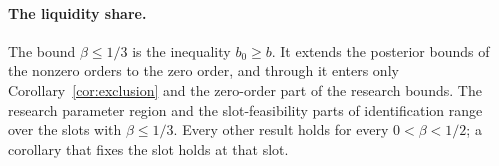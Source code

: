 \paragraph{The liquidity share.}\label{par:beta-scope}
The bound \(\beta\le1/3\) is the inequality \(b_0\ge b\). It extends the posterior bounds of the nonzero orders
to the zero order, and through it enters only Corollary~\ref{cor:exclusion} and the zero-order part of the
research bounds. The research parameter region and the slot-feasibility parts of identification range over the
slots with \(\beta\le1/3\). Every other result holds for every \(0<\beta<1/2\); a corollary that fixes the slot
holds at that slot.

